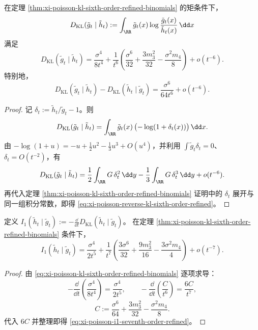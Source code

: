 \begin{proposition}\label{prop:xi-poisson-reverse-kl-sixth-order-refined}
在定理 \ref{thm:xi-poisson-kl-sixth-order-refined-binomials} 的矩条件下，
\[
D_{\mathrm{KL}}(\tilde g_t\mid \tilde h_t)
:=\int_{\RR}\tilde g_t(x)\log\frac{\tilde g_t(x)}{\tilde h_t(x)}\,\dd x
\]
满足
\begin{equation}\label{eq:xi-poisson-reverse-kl-sixth-order-refined}
D_{\mathrm{KL}}(\tilde g_t\mid \tilde h_t)
=\frac{\sigma^4}{8t^4}
+\frac{1}{t^6}\left(
\frac{\sigma^6}{32}
+\frac{3m_3^2}{32}
-\frac{\sigma^2m_4}{8}
\right)
+o(t^{-6}).
\end{equation}
特别地，
\[
D_{\mathrm{KL}}(\tilde g_t\mid \tilde h_t)-D_{\mathrm{KL}}(\tilde h_t\mid \tilde g_t)
=\frac{\sigma^6}{64t^6}+o(t^{-6}).
\]
\end{proposition}

\begin{proof}
记 \(\delta_t:=\tilde h_t/\tilde g_t-1\)。则
\[
D_{\mathrm{KL}}(\tilde g_t\mid \tilde h_t)
=\int_{\RR}\tilde g_t(x)\,\bigl(-\log(1+\delta_t(x))\bigr)\,\dd x.
\]
由
\(
-\log(1+u)=-u+\frac12u^2-\frac13u^3+O(u^4)
\)，并利用 \(\int\tilde g_t\delta_t=0\)、\(\delta_t=O(t^{-2})\)，有
\[
D_{\mathrm{KL}}(\tilde g_t\mid \tilde h_t)
=\frac12\int_{\RR}G\,\delta_t^2\,\dd y
-\frac13\int_{\RR}G\,\delta_t^3\,\dd y
+o(t^{-6}).
\]
再代入定理 \ref{thm:xi-poisson-kl-sixth-order-refined-binomials} 证明中的 \(\delta_t\) 展开与同一组积分常数，即得
\eqref{eq:xi-poisson-reverse-kl-sixth-order-refined}。
\end{proof}

\begin{corollary}\label{cor:xi-poisson-i1-seventh-order-refined}
定义
\(
I_1(\tilde h_t\mid \tilde g_t):=-\frac{\dd}{\dd t}D_{\mathrm{KL}}(\tilde h_t\mid \tilde g_t)
\)。
在定理 \ref{thm:xi-poisson-kl-sixth-order-refined-binomials} 条件下，
\begin{equation}\label{eq:xi-poisson-i1-seventh-order-refined}
I_1(\tilde h_t\mid \tilde g_t)
=\frac{\sigma^4}{2t^5}
+\frac{1}{t^7}\left(
\frac{3\sigma^6}{32}
+\frac{9m_3^2}{16}
-\frac{3\sigma^2m_4}{4}
\right)
+o(t^{-7}).
\end{equation}
\end{corollary}

\begin{proof}
由 \eqref{eq:xi-poisson-kl-sixth-order-refined-binomials} 逐项求导：
\[
-\frac{\dd}{\dd t}\!\left(\frac{\sigma^4}{8t^4}\right)=\frac{\sigma^4}{2t^5},\qquad
-\frac{\dd}{\dd t}\!\left(\frac{C}{t^6}\right)=\frac{6C}{t^7},
\]
\[
C:=\frac{\sigma^6}{64}+\frac{3m_3^2}{32}-\frac{\sigma^2m_4}{8}.
\]
代入 \(6C\) 并整理即得 \eqref{eq:xi-poisson-i1-seventh-order-refined}。
\end{proof}

